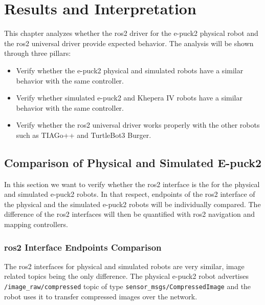 \chapter{Results and Interpretation}
\label{chap:results}

This chapter analyzes whether the \ac{ros2} driver for the e-puck2 physical robot and the \ac{ros2} universal driver provide expected behavior. The analysis will be shown through three pillars:
\begin{itemize}
    \item Verify whether the e-puck2 physical and simulated robots have a similar behavior with the same controller.
    \item Verify whether simulated e-puck2 and Khepera IV robots have a similar behavior with the same controller.
    \item Verify whether the \ac{ros2} universal driver works properly with the other robots such as TIAGo++ and TurtleBot3 Burger.
\end{itemize}


\section{Comparison of Physical and Simulated E-puck2}

In this section we want to verify whether the \ac{ros2} interface is the for the physical and simulated e-puck2 robots.
In that respect, endpoints of the \ac{ros2} interface of the physical and the simulated e-puck2 robots will be individually compared.
The difference of the \ac{ros2} interfaces will then be quantified with \ac{ros2} navigation and mapping controllers.

\subsection{\ac{ros2} Interface Endpoints Comparison}

The \ac{ros2} interfaces for physical and simulated robots are very similar, image related topics being the only difference.
The physical e-puck2 robot advertises \texttt{/image\_raw/compressed} topic of type \texttt{sensor\_msgs/CompressedImage} and the robot uses it to transfer compressed images over the network.


